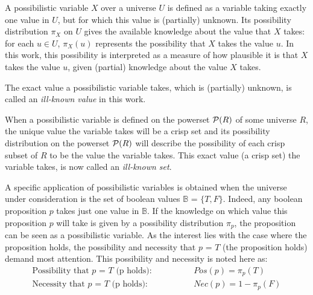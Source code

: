 \begin{definition}
A possibilistic variable $X$ over a universe $U$ is defined as a variable taking exactly one value in $U$, but for which this value is (partially) unknown. Its possibility distribution $\pi_X$ on $U$ gives the available knowledge about the value that $X$ takes: for each $u\in U$, $\pi_X(u)$ represents the possibility that $X$ takes the value $u$. In this work, this possibility is interpreted as a measure of how plausible it is that $X$ takes the value $u$, given (partial) knowledge about the value $X$ takes.
\end{definition}

The exact value a possibilistic variable takes, which is (partially) unknown, is called an \emph{ill-known value} in this work\cite{Dubois88b}.

When a possibilistic variable is defined on the powerset $\mathcal{P}(R)$ of some universe $R$, the unique value the variable takes will be a crisp set and its possibility distribution on the powerset $\mathcal{P}(R)$ will describe the possibility of each crisp subset of $R$ to be the value the variable takes. This exact value (a crisp set) the variable takes, is now called an \emph{ill-known set}\cite{Dubois88b}.



A specific application of possibilistic variables is obtained when the universe under consideration is the set of boolean values $\mathbb{B}$ = $\{T,F\}$. Indeed, any boolean proposition $p$ takes just one value in $\mathbb{B}$. If the knowledge on which value this proposition $p$ will take is given by a possibility distribution $\pi_p$, the proposition can be seen as a possibilistic variable. As the interest lies with the case where the proposition holds, the possibility and necessity that $p$ = $T$ (the proposition holds) demand most attention. This possibility and necessity is noted here as:
\begin{align}
\text{Possibility that $p$ = $T$ (p holds):} \hspace{50pt} & Pos(p) = \pi_p(T) \label{propholdsposs} \\
\text{Necessity that $p$ = $T$ (p holds):} \hspace{50pt} & Nec(p) = 1-\pi_p(F) \label{propholdsnecc}
\end{align}

